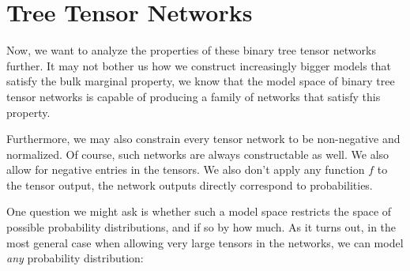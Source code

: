 \documentclass[../../main.tex]{subfiles}
\begin{document}
\section{Tree Tensor Networks}
    Now, we want to analyze the properties of these binary tree tensor networks further. It may not bother us how we construct increasingly bigger models that satisfy the bulk marginal property, we know that the model space of binary tree tensor networks is capable of producing a family of networks that satisfy this property.

    Furthermore, we may also constrain every tensor network to be non-negative and normalized. Of course, such networks are always constructable as well. We also allow for negative entries in the tensors. We also don't apply any function $f$ to the tensor output, the network outputs directly correspond to probabilities.

    One question we might ask is whether such a model space restricts the space of possible probability distributions, and if so by how much. As it turns out, in the most general case when allowing very large tensors in the networks, we can model \emph{any} probability distribution:
\end{document}
